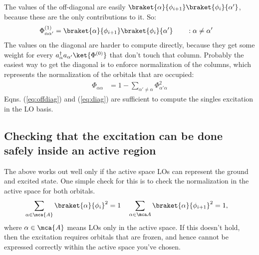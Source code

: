 \documentclass[10pt]{article}
\begin{document}
The values of the off-diagonal are easily $
  \braket{\alpha}{\phi_{i+1}}
  \braket{\phi_i}{\alpha'}
$, because these are the only contributions to it.
So:
\begin{align}
  \label{eq:offdiag}
  \Phi^{(1)}_{\alpha \alpha'}
  &=
  \braket{\alpha}{\phi_{i+1}}
  \braket{\phi_i}{\alpha'}
  \qquad
  :\alpha \ne \alpha'
\end{align}
The values on the diagonal are harder to compute directly, because they get some weight for every $
    a_\alpha^\dag a_{\alpha'} \ket{\Phi^{(0)}}
$ that don't touch that column.
Probably the easiest way to get the diagonal is to enforce normalization of the columns, which represents the normalization of the orbitals that are occupied:
\begin{align}
  \label{eq:diag}
  \Phi_{\alpha \alpha}
  &=
  1 
  -
  \sum_{\alpha' \ne \alpha}
  \Phi_{\alpha' \alpha}^2
\end{align}
Eqns. (\ref{eq:offdiag}) and (\ref{eq:diag}) are sufficient to compute the singles excitation in the LO basis.

\subsection{Checking that the excitation can be done safely inside an active region}

The above works out well only if the active space LOs can represent the ground and excited state. 
One simple check for this is to check the normalization in the active space for both orbitals.
\begin{align}
  &
  \sum_{\alpha \in \mca{A}}
  \braket{\alpha}{\phi_i}^2
  = 1
  &
  &
  \sum_{\alpha \in \mca A}
  \braket{\alpha}{\phi_{i+1}}^2
  = 1,
  &
\end{align}
where $\alpha \in \mca{A}$ means LOs only in the active space.
If this doesn't hold, then the excitation requires orbitals that are frozen, and hence cannot be expressed correctly within the active space you've chosen.
\end{document}
